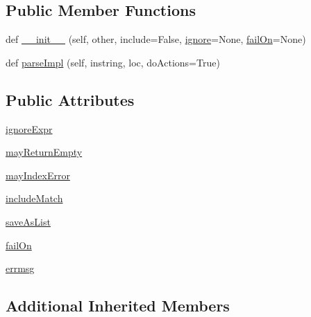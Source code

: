 \subsection*{Public Member Functions}
\begin{DoxyCompactItemize}
\item 
def \hyperlink{classpip_1_1__vendor_1_1pyparsing_1_1SkipTo_a2223a69e03127eec99317f347f7207fa}{\+\_\+\+\_\+init\+\_\+\+\_\+} (self, other, include=False, \hyperlink{classpip_1_1__vendor_1_1pyparsing_1_1ParseElementEnhance_a255dfc9812e718bab064c6db0ab3ef56}{ignore}=None, \hyperlink{classpip_1_1__vendor_1_1pyparsing_1_1SkipTo_a3e6d7537eb47830365d5a1299b5838bf}{fail\+On}=None)
\item 
def \hyperlink{classpip_1_1__vendor_1_1pyparsing_1_1SkipTo_a93ec71670b2ee3711605ebdbe776e20e}{parse\+Impl} (self, instring, loc, do\+Actions=True)
\end{DoxyCompactItemize}
\subsection*{Public Attributes}
\begin{DoxyCompactItemize}
\item 
\hyperlink{classpip_1_1__vendor_1_1pyparsing_1_1SkipTo_aaed845f5b629b2dc888988bf135b4e28}{ignore\+Expr}
\item 
\hyperlink{classpip_1_1__vendor_1_1pyparsing_1_1SkipTo_a9d4f3c24963b989e78d76db03bf144af}{may\+Return\+Empty}
\item 
\hyperlink{classpip_1_1__vendor_1_1pyparsing_1_1SkipTo_a48f6d9c91fb5f41d0c1524fe3024ff66}{may\+Index\+Error}
\item 
\hyperlink{classpip_1_1__vendor_1_1pyparsing_1_1SkipTo_afef28dd7c939738f93ce6463bf8519cf}{include\+Match}
\item 
\hyperlink{classpip_1_1__vendor_1_1pyparsing_1_1SkipTo_a976ea1d4aee07e9476cbcba25b14b029}{save\+As\+List}
\item 
\hyperlink{classpip_1_1__vendor_1_1pyparsing_1_1SkipTo_a3e6d7537eb47830365d5a1299b5838bf}{fail\+On}
\item 
\hyperlink{classpip_1_1__vendor_1_1pyparsing_1_1SkipTo_aa84f98748cb783cd94bd5bea2cbc41bb}{errmsg}
\end{DoxyCompactItemize}
\subsection*{Additional Inherited Members}


